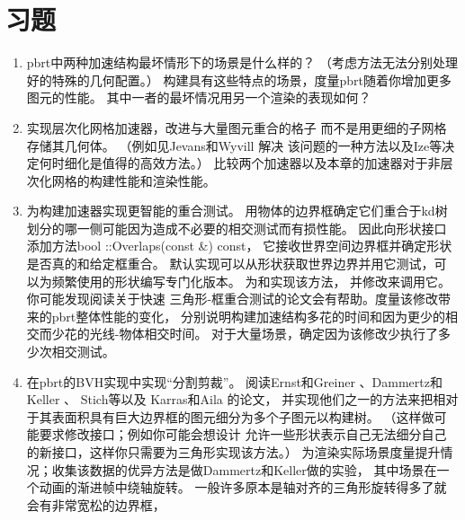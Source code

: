 \section{习题}\label{sec:习题04}

\begin{enumerate}
    \item \circletwo pbrt中两种加速结构最坏情形下的场景是什么样的？
          （考虑方法无法分别处理好的特殊的几何配置。）
          构建具有这些特点的场景，度量pbrt随着你增加更多图元的性能。
          其中一者的最坏情况用另一个渲染的表现如何？
    \item \circletwo 实现层次化网格加速器，改进与大量图元重合的格子
          而不是用更细的子网格存储其几何体。
          （例如见Jevans和Wyvill \parencite*{Jevans1989:23}解决
          该问题的一种方法以及Ize等\parencite*{4342587}决定何时细化是值得的高效方法。）
          比较两个加速器以及本章的加速器对于非层次化网格的构建性能和渲染性能。
    \item \circletwo 为构建加速器实现更智能的重合测试。
          用物体的边界框确定它们重合于kd树划分的哪一侧可能因为造成不必要的相交测试而有损性能。
          因此向形状接口添加方法{\ttfamily bool ::Overlaps(const  \&) const}，
          它接收世界空间边界框并确定形状是否真的和给定框重合。
          默认实现可以从形状获取世界边界并用它测试，可以为频繁使用的形状编写专门化版本。
          为和实现该方法，
          并修改来调用它。
          你可能发现阅读\citet{doi:10.1080/10867651.2001.10487535}关于快速
          三角形-框重合测试的论文会有帮助。度量该修改带来的pbrt整体性能的变化，
          分别说明构建加速结构多花的时间和因为更少的相交而少花的光线-物体相交时间。
          对于大量场景，确定因为该修改少执行了多少次相交测试。
    \item \circletwo 在pbrt的BVH实现中实现“分割剪裁”。
          阅读Ernst和Greiner \parencite*{4342593}、Dammertz和Keller \parencite*{4634636}、
          Stich等\parencite*{10.1145/1572769.1572771}以及
          Karras和Aila \parencite*{10.1145/2492045.2492055}的论文，
          并实现他们之一的方法来把相对于其表面积具有巨大边界框的图元细分为多个子图元以构建树。
          （这样做可能要求修改接口；例如你可能会想设计
          允许一些形状表示自己无法细分自己的新接口，这样你只需要为三角形实现该方法。）
          为渲染实际场景度量提升情况；收集该数据的优异方法是做Dammertz和Keller做的实验，
          其中场景在一个动画的渐进帧中绕轴旋转。
          一般许多原本是轴对齐的三角形旋转得多了就会有非常宽松的边界框，

\end{enumerate}
